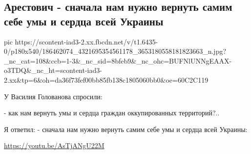  
 
 
 
 
\subsection{Арестович - сначала нам нужно вернуть самим себе умы и сердца всей Украины}

\ifcmt
  pic https://scontent-iad3-2.xx.fbcdn.net/v/t1.6435-0/p180x540/186462074_4321695354561178_3653180558181823663_n.jpg?_nc_cat=108&ccb=1-3&_nc_sid=8bfeb9&_nc_ohc=BUFNlUNNgEAAX-o3TDQ&_nc_ht=scontent-iad3-2.xx&tp=6&oh=da36f73fef00bb85fb138c1805060bb0&oe=60C2C119
\fi

У Василия Голованова спросили:

- как нам вернуть умы и сердца граждан оккупированных территорий?..

Я ответил:
- сначала нам нужно вернуть самим себе умы и сердца всей Украины: 

\url{https://youtu.be/AsTjANgU22M}
